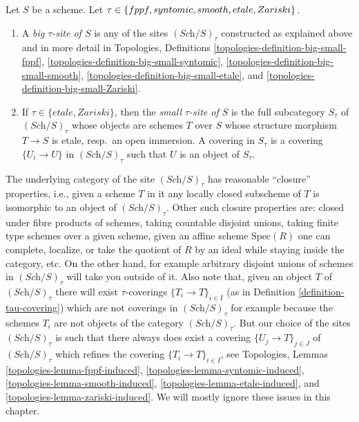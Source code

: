 \begin{definition}
\label{definition-tau-site}
Let $S$ be a scheme.
Let $\tau \in \{fppf, syntomic, smooth, etale,\linebreak[0] Zariski\}$.
\begin{enumerate}
\item A {\it big $\tau$-site of $S$} is any of the sites
$(\textit{Sch}/S)_\tau$ constructed as explained above and in more detail in
Topologies, Definitions
\ref{topologies-definition-big-small-fppf},
\ref{topologies-definition-big-small-syntomic},
\ref{topologies-definition-big-small-smooth},
\ref{topologies-definition-big-small-etale}, and
\ref{topologies-definition-big-small-Zariski}.
\item If $\tau \in \{etale, Zariski\}$, then the {\it small $\tau$-site of $S$}
is the full subcategory $S_\tau$ of $(\textit{Sch}/S)_\tau$ whose objects
are schemes $T$ over $S$ whose structure morphism $T \to S$ is etale,
resp.\ an open immersion. A covering in $S_\tau$ is a covering
$\{U_i \to U\}$ in $(\textit{Sch}/S)_\tau$
such that $U$ is an object of $S_\tau$.
\end{enumerate}
\end{definition}

\noindent
The underlying category of the site $(\textit{Sch}/S)_\tau$ has reasonable
``closure'' properties, i.e., given a scheme $T$ in it any locally closed
subscheme of $T$ is isomorphic to an object of $(\textit{Sch}/S)_\tau$.
Other such closure properties are: closed under fibre products of schemes,
taking countable disjoint unions,
taking finite type schemes over a given scheme, given an affine scheme
$\text{Spec}(R)$ one can complete, localize, or take the quotient of $R$
by an ideal while staying inside the category, etc.
On the other hand, for example arbitrary disjoint unions
of schemes in $(\textit{Sch}/S)_\tau$ will take you outside of it.
Also note that, given an object $T$ of $(\textit{Sch}/S)_\tau$ there will exist
$\tau$-coverings $\{T_i \to T\}_{i \in I}$ (as in
Definition \ref{definition-tau-covering})
which are not coverings in $(\textit{Sch}/S)_\tau$ for example
because the schemes $T_i$ are not objects of the category
$(\textit{Sch}/S)_\tau$. But our choice of the sites $(\textit{Sch}/S)_\tau$
is such that there always does exist
a covering $\{U_j \to T\}_{j \in J}$ of $(\textit{Sch}/S)_\tau$ which refines
the covering $\{T_i \to T\}_{i \in I}$, see
Topologies, Lemmas
\ref{topologies-lemma-fppf-induced},
\ref{topologies-lemma-syntomic-induced},
\ref{topologies-lemma-smooth-induced},
\ref{topologies-lemma-etale-induced}, and
\ref{topologies-lemma-zariski-induced}.
We will mostly ignore these issues in this chapter.

